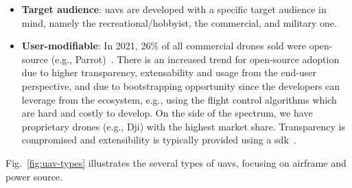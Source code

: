 \begin{itemize}
  fuel, or a hybrid solution. Except for the fuel-only powered ones (e.g., Nitro
  Stingray, and Goliath Quadcopter~\cite{gasPoweredDrone}), all the
  others use electric motors. These motors can be powered through batteries
  (e.g., Parrot\cite{parrotDrone}, Dji Mavic 3~\cite{djiMavic3Drone}),
  typically \gls{lipo}, \glspl{hfc} (e.g., Energyor H2Quad 1000~\cite{energyorDrone}), and solar power. The
  hybrid solutions use fuel + batteries (e.g., Flaperon MX8~\cite{flaperonDrone}) or \gls{hfc} + batteries, and are a compromise between the
  two power sources. Batteries typically have the shortest autonomy and are
  heavy and bulky, while fuel, although not a clean power source, has the
  highest power density, leading to higher autonomy. The hydrogen fuel cells are
  a intermediate solution, but are typically more expensive than batteries and
  have more complex power management.
%  
\item \textbf{Target audience}: \glspl{uav} are developed with a specific target
  audience in mind, namely the recreational/hobbyist, the commercial, and
  military one.
%  
\item \textbf{User-modifiable}: In 2021, 26\% of all commercial drones sold were
  open-source (e.g., Parrot)~\cite{droneAnalyst2021}. There is an increased trend for open-source
  adoption due to higher transparency, extensability and usage from the end-user
  perspective, and due to bootstrapping opportunity since the developers can
  leverage from the ecosystem, e.g., using the flight control algorithms which
  are hard and costly to develop. On the side of the spectrum, we have
  proprietary drones (e.g., Dji) with the highest market share. Transparency is
  compromised and extensibility is typically provided using a \gls{sdk}~\cite{djiSDK}.
\end{itemize}

Fig.~\ref{fig:uav-types} illustrates the several types of \glspl{uav}, focusing
on airframe and power source.

